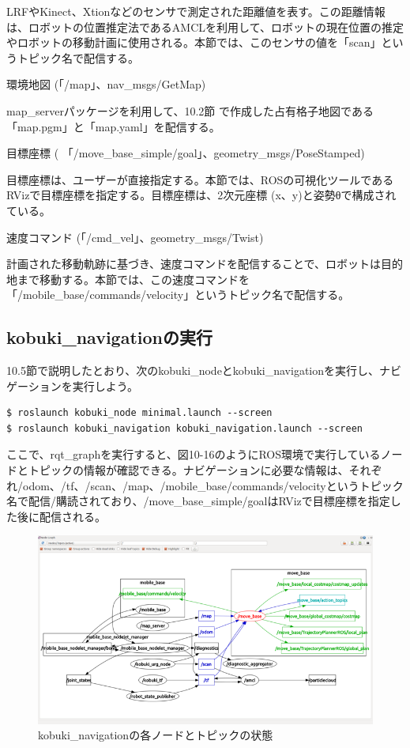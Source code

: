 LRFやKinect、Xtionなどのセンサで測定された距離値を表す。この距離情報は、ロボットの位置推定法であるAMCLを利用して、ロボットの現在位置の推定やロボットの移動計画に使用される。本節では、このセンサの値を「scan」というトピック名で配信する。

\circled{\thenum} 環境地図 (「/map」、nav\_msgs/GetMap)

map\_serverパッケージを利用して、10.2節  で作成した占有格子地図である「map.pgm」と「map.yaml」を配信する。

\circled{\thenum} 目標座標 ( 「/move\_base\_simple/goal」、geometry\_msgs/PoseStamped)

目標座標は、ユーザーが直接指定する。本節では、ROSの可視化ツールであるRVizで目標座標を指定する。目標座標は、2次元座標 (x、y)と姿勢θで構成されている。

\circled{\thenum} 速度コマンド (「/cmd\_vel」、geometry\_msgs/Twist)

計画された移動軌跡に基づき、速度コマンドを配信することで、ロボットは目的地まで移動する。本節では、この速度コマンドを「/mobile\_base/commands/velocity」というトピック名で配信する。

\subsection{kobuki\_navigationの実行}

10.5節で説明したとおり、次のkobuki\_nodeとkobuki\_navigationを実行し、ナビゲーションを実行しよう。

\begin{lstlisting}[language=ROS]
$ roslaunch kobuki_node minimal.launch --screen
$ roslaunch kobuki_navigation kobuki_navigation.launch --screen
\end{lstlisting}

ここで、rqt\_graphを実行すると、図10-16のようにROS環境で実行しているノードとトピックの情報が確認できる。ナビゲーションに必要な情報は、それぞれ/odom、/tf、/scan、/map、/mobile\_base/commands/velocityというトピック名で配信/購読されており、/move\_base\_simple/goalはRVizで目標座標を指定した後に配信される。

\begin{figure}[ht]
  \centering
  \includegraphics[width=\columnwidth]{pictures/chapter10/pic_10_16.png}
  \caption{kobuki\_navigationの各ノードとトピックの状態}
\end{figure}

